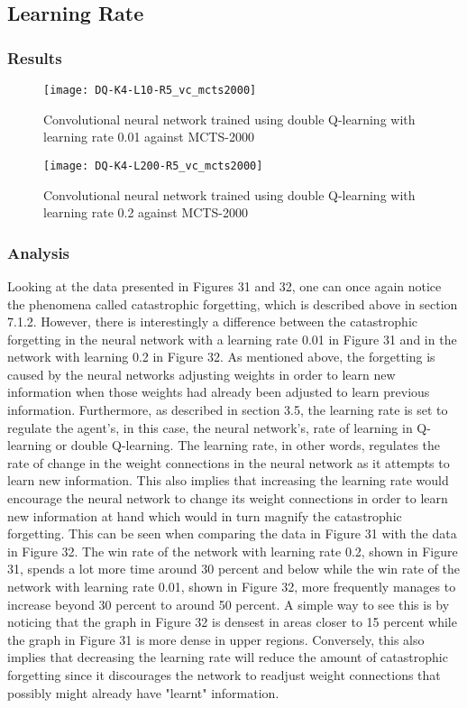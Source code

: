 \documentclass[titlepage]{article}
\begin{document}
\subsection{Learning Rate}

\subsubsection{Results}

\begin{figure}[h]
    \center
    \texttt{[image: DQ-K4-L10-R5\_vc\_mcts2000]}
    \caption{Convolutional neural network trained using double Q-learning with learning rate 0.01 against MCTS-2000}
\end{figure}

\newpage

\begin{figure}[h]
    \center
    \texttt{[image: DQ-K4-L200-R5\_vc\_mcts2000]}
    \caption{Convolutional neural network trained using double Q-learning with learning rate 0.2 against MCTS-2000}
\end{figure}

\subsubsection{Analysis}

\vskip 0.2cm

Looking at the data presented in Figures 31 and 32, one can once again notice the phenomena called catastrophic forgetting, which is described above in section 7.1.2. However, there is interestingly a difference between the catastrophic forgetting in the neural network with a learning rate 0.01 in Figure 31 and in the network with learning 0.2 in Figure 32. As mentioned above, the forgetting is caused by the neural networks adjusting weights in order to learn new information when those weights had already been adjusted to learn previous information. Furthermore, as described in section 3.5, the learning rate is set to regulate the agent's, in this case, the neural network's, rate of learning in Q-learning or double Q-learning. The learning rate, in other words, regulates the rate of change in the weight connections in the neural network as it attempts to learn new information. This also implies that increasing the learning rate would encourage the neural network to change its weight connections in order to learn new information at hand which would in turn magnify the catastrophic forgetting. This can be seen when comparing the data in Figure 31 with the data in Figure 32. The win rate of the network with learning rate 0.2, shown in Figure 31, spends a lot more time around 30 percent and below while the win rate of the network with learning rate 0.01, shown in Figure 32, more frequently manages to increase beyond 30 percent to around 50 percent. A simple way to see this is by noticing that the graph in Figure 32 is densest in areas closer to 15 percent while the graph in Figure 31 is more dense in upper regions. Conversely, this also implies that decreasing the learning rate will reduce the amount of catastrophic forgetting since it discourages the network to readjust weight connections that possibly might already have "learnt" information.
\end{document}
